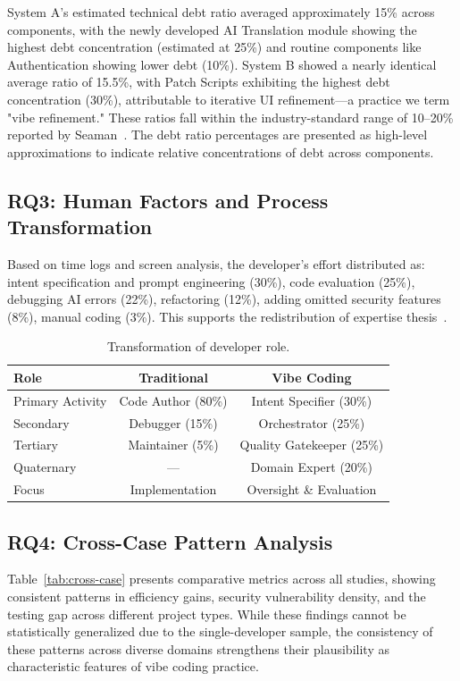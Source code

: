 \documentclass[sigconf]{acmart}
\begin{document}
System A's estimated technical debt ratio averaged approximately 15\% across components, with the newly developed AI Translation module showing the highest debt concentration (estimated at 25\%) and routine components like Authentication showing lower debt (10\%). System B showed a nearly identical average ratio of 15.5\%, with Patch Scripts exhibiting the highest debt concentration (30\%), attributable to iterative UI refinement—a practice we term "vibe refinement." These ratios fall within the industry-standard range of 10–20\% reported by Seaman~\cite{seaman2011measuring}. The debt ratio percentages are presented as high-level approximations to indicate relative concentrations of debt across components.

\subsection{RQ3: Human Factors and Process Transformation}

Based on time logs and screen analysis, the developer's effort distributed as: intent specification and prompt engineering (30\%), code evaluation (25\%), debugging AI errors (22\%), refactoring (12\%), adding omitted security features (8\%), manual coding (3\%). This supports the redistribution of expertise thesis~\cite{barke2023grounded}.

\begin{table}[htbp]
\centering
\begin{tabular}{|l|c|c|}
\hline
\textbf{Role} & \textbf{Traditional} & \textbf{Vibe Coding} \\
\hline
Primary Activity & Code Author (80\%) & Intent Specifier (30\%) \\
Secondary & Debugger (15\%) & Orchestrator (25\%) \\
Tertiary & Maintainer (5\%) & Quality Gatekeeper (25\%) \\
Quaternary & --- & Domain Expert (20\%) \\
\hline
Focus & Implementation & Oversight \& Evaluation \\
\hline
\end{tabular}
\caption{Transformation of developer role.}
\label{tab:role}
\end{table}

\subsection{RQ4: Cross-Case Pattern Analysis}

Table~\ref{tab:cross-case} presents comparative metrics across all studies, showing consistent patterns in efficiency gains, security vulnerability density, and the testing gap across different project types. While these findings cannot be statistically generalized due to the single-developer sample, the consistency of these patterns across diverse domains strengthens their plausibility as characteristic features of vibe coding practice.
\end{document}
